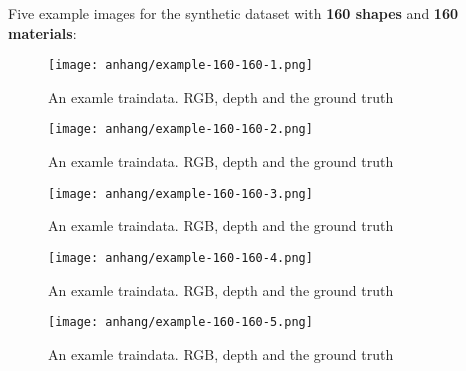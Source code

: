 	\FloatBarrier
	\clearpage
	Five example images for the synthetic dataset with \textbf{160 shapes} and \textbf{160 materials}:
	\begin{figure}[H]
		\centering
		\texttt{[image: anhang/example-160-160-1.png]}
		\caption[An examle traindata. RGB, depth and the ground truth]{An examle traindata. RGB, depth and the ground truth}
	\end{figure}
	\begin{figure}[H]
		\centering
		\texttt{[image: anhang/example-160-160-2.png]}
		\caption[An examle traindata. RGB, depth and the ground truth]{An examle traindata. RGB, depth and the ground truth}
	\end{figure}
	\begin{figure}[H]
		\centering
		\texttt{[image: anhang/example-160-160-3.png]}
		\caption[An examle traindata. RGB, depth and the ground truth]{An examle traindata. RGB, depth and the ground truth}
	\end{figure}
	\begin{figure}[H]
		\centering
		\texttt{[image: anhang/example-160-160-4.png]}
		\caption[An examle traindata. RGB, depth and the ground truth]{An examle traindata. RGB, depth and the ground truth}
	\end{figure}
	\begin{figure}[H]
		\centering
		\texttt{[image: anhang/example-160-160-5.png]}
		\caption[An examle traindata. RGB, depth and the ground truth]{An examle traindata. RGB, depth and the ground truth}
	\end{figure}

